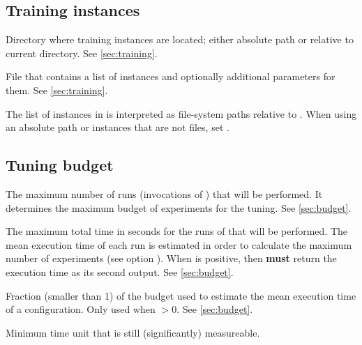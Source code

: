 \subsection[Training instances]{Training instances}
\begin{description}
Directory where training instances are located; either absolute path or relative to current directory. See \autoref{sec:training}.

File that contains a list of instances and optionally additional parameters for them. See \autoref{sec:training}.
\begin{xwarningbox}
The list of instances in  is interpreted as file-system paths  relative to . When using an absolute path or instances that are not files, set .
\end{xwarningbox}

\end{description}

\subsection[Tuning budget]{Tuning budget}
\begin{description}
The maximum number of runs (invocations of ) that will be performed. It determines the maximum budget of experiments for the tuning. See \autoref{sec:budget}.

The maximum total time in seconds for the runs of  that will be  performed. The mean execution time  of each run is estimated in order to calculate the maximum number of experiments (see option ).
  When  is positive, then  \textbf{must} return the execution time as its second output. See \autoref{sec:budget}.

Fraction (smaller than 1) of the budget used to estimate the mean execution time of a configuration. Only used when  $> 0$. See \autoref{sec:budget}.

Minimum time unit that is still (significantly) measureable.

\end{description}

